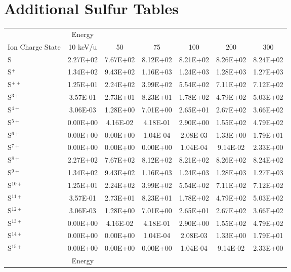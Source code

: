 \section{Additional Sulfur Tables}
\label{app:Sul}

\begin{table}[h]
    \centering
    \begin{tabular}{l|c|c|c|c|c|c}
    \hline
    & Energy & & & & & \\
    Ion Charge State & 10 keV/u & 50 & 75 & 100 & 200 & 300 \\
    \hline
    S & 2.27E+02 & 7.67E+02 & 8.12E+02 & 8.21E+02 & 8.26E+02 & 8.24E+02 \\
    S$^+$ & 1.34E+02 & 9.43E+02 & 1.16E+03 & 1.24E+03 & 1.28E+03 & 1.27E+03 \\
    S$^{++}$ & 1.25E+01 & 2.24E+02 & 3.99E+02 & 5.54E+02 & 7.11E+02 & 7.12E+02 \\
    S$^{3+}$ & 3.57E-01 & 2.73E+01 & 8.23E+01 & 1.78E+02 & 4.79E+02 & 5.03E+02 \\
    S$^{4+}$ & 3.06E-03 & 1.28E+00 & 7.01E+00 & 2.65E+01 & 2.67E+02 & 3.66E+02 \\
    S$^{5+}$ & 0.00E+00 & 4.16E-02 & 4.18E-01 & 2.90E+00 & 1.55E+02 & 4.79E+02 \\
    S$^{6+}$ & 0.00E+00 & 0.00E+00 & 1.04E-04 & 2.08E-03 & 1.33E+00 & 1.79E+01 \\
    S$^{7+}$ & 0.00E+00 & 0.00E+00 & 0.00E+00 & 1.04E-04 & 9.14E-02 & 2.33E+00 \\
    S$^{8+}$ & 2.27E+02 & 7.67E+02 & 8.12E+02 & 8.21E+02 & 8.26E+02 & 8.24E+02 \\
    S$^{9+}$ & 1.34E+02 & 9.43E+02 & 1.16E+03 & 1.24E+03 & 1.28E+03 & 1.27E+03 \\
    S$^{10+}$ & 1.25E+01 & 2.24E+02 & 3.99E+02 & 5.54E+02 & 7.11E+02 & 7.12E+02 \\
    S$^{11+}$ & 3.57E-01 & 2.73E+01 & 8.23E+01 & 1.78E+02 & 4.79E+02 & 5.03E+02 \\
    S$^{12+}$ & 3.06E-03 & 1.28E+00 & 7.01E+00 & 2.65E+01 & 2.67E+02 & 3.66E+02 \\
    S$^{13+}$ & 0.00E+00 & 4.16E-02 & 4.18E-01 & 2.90E+00 & 1.55E+02 & 4.79E+02 \\
    S$^{14+}$ & 0.00E+00 & 0.00E+00 & 1.04E-04 & 2.08E-03 & 1.33E+00 & 1.79E+01 \\
    S$^{15+}$ & 0.00E+00 & 0.00E+00 & 0.00E+00 & 1.04E-04 & 9.14E-02 & 2.33E+00 \\
    \hline
    \hline
    & Energy & & & & & \\

\end{tabular}
\end{table}
